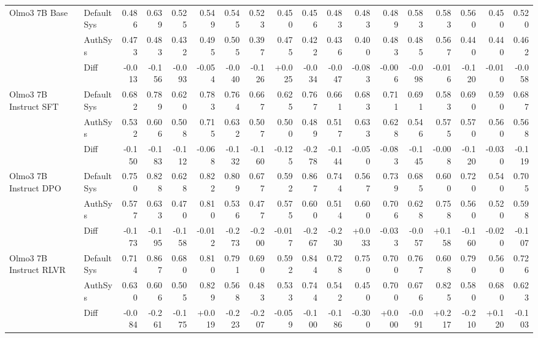 \begin{table}[htbp]
{\begin{tabular}{llrrrrrrrrrrrrrrrr}
Olmo3 7B Base & DefaultSys & 0.486 & 0.639 & 0.525 & 0.549 & 0.545 & 0.523 & 0.450 & 0.456 & 0.483 & 0.483 & 0.489 & 0.583 & 0.583 & 0.560 & 0.450 & 0.520 \\
 & AuthSys & 0.473 & 0.483 & 0.432 & 0.495 & 0.505 & 0.397 & 0.475 & 0.422 & 0.436 & 0.400 & 0.483 & 0.485 & 0.567 & 0.440 & 0.440 & 0.462 \\
\rowcolor{Gray} & Diff & -0.013 & -0.156 & -0.093 & -0.054 & -0.040 & -0.126 & +0.025 & -0.034 & -0.047 & -0.083 & -0.006 & -0.098 & -0.016 & -0.120 & -0.010 & -0.058 \\
Olmo3 7B Instruct SFT & DefaultSys & 0.682 & 0.789 & 0.620 & 0.783 & 0.764 & 0.667 & 0.625 & 0.767 & 0.661 & 0.683 & 0.711 & 0.691 & 0.583 & 0.690 & 0.590 & 0.687 \\
 & AuthSys & 0.532 & 0.606 & 0.508 & 0.715 & 0.632 & 0.507 & 0.500 & 0.489 & 0.517 & 0.633 & 0.628 & 0.546 & 0.575 & 0.570 & 0.560 & 0.568 \\
\rowcolor{Gray} & Diff & -0.150 & -0.183 & -0.112 & -0.068 & -0.132 & -0.160 & -0.125 & -0.278 & -0.144 & -0.050 & -0.083 & -0.145 & -0.008 & -0.120 & -0.030 & -0.119 \\
Olmo3 7B Instruct DPO & DefaultSys & 0.750 & 0.828 & 0.628 & 0.822 & 0.809 & 0.677 & 0.592 & 0.867 & 0.744 & 0.567 & 0.739 & 0.685 & 0.600 & 0.720 & 0.540 & 0.705 \\
 & AuthSys & 0.577 & 0.633 & 0.470 & 0.810 & 0.536 & 0.477 & 0.575 & 0.600 & 0.514 & 0.600 & 0.706 & 0.628 & 0.758 & 0.560 & 0.520 & 0.598 \\
\rowcolor{Gray} & Diff & -0.173 & -0.195 & -0.158 & -0.012 & -0.273 & -0.200 & -0.017 & -0.267 & -0.230 & +0.033 & -0.033 & -0.057 & +0.158 & -0.160 & -0.020 & -0.107 \\
Olmo3 7B Instruct RLVR & DefaultSys & 0.714 & 0.867 & 0.680 & 0.810 & 0.791 & 0.690 & 0.592 & 0.844 & 0.728 & 0.750 & 0.700 & 0.767 & 0.608 & 0.790 & 0.560 & 0.726 \\
 & AuthSys & 0.630 & 0.606 & 0.505 & 0.829 & 0.568 & 0.483 & 0.533 & 0.744 & 0.542 & 0.450 & 0.700 & 0.676 & 0.825 & 0.580 & 0.680 & 0.623 \\
\rowcolor{Gray} & Diff & -0.084 & -0.261 & -0.175 & +0.019 & -0.223 & -0.207 & -0.059 & -0.100 & -0.186 & -0.300 & +0.000 & -0.091 & +0.217 & -0.210 & +0.120 & -0.103 \\
\bottomrule
\end{tabular}
}%
\end{table}
